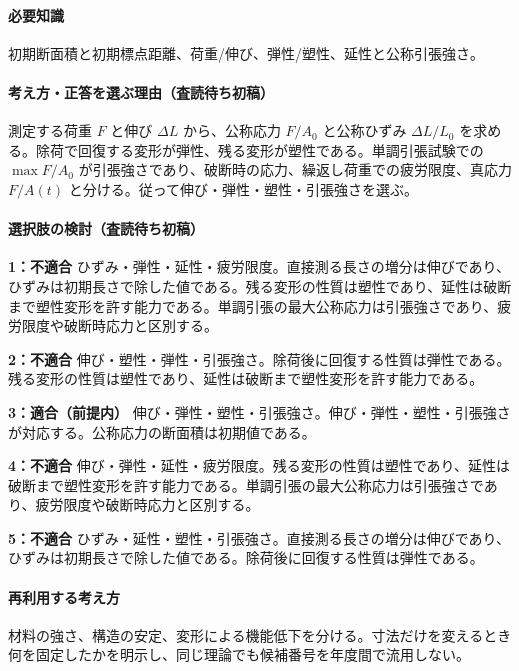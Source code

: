 \paragraph{必要知識} 初期断面積と初期標点距離、荷重/伸び、弾性/塑性、延性と公称引張強さ。

\paragraph{考え方・正答を選ぶ理由（査読待ち初稿）} 測定する荷重 \(F\) と伸び \(\Delta L\) から、公称応力 \(F/A_0\) と公称ひずみ \(\Delta L/L_0\) を求める。除荷で回復する変形が弾性、残る変形が塑性である。単調引張試験での \(\max F/A_0\) が引張強さであり、破断時の応力、繰返し荷重での疲労限度、真応力 \(F/A(t)\) と分ける。従って伸び・弾性・塑性・引張強さを選ぶ。

\paragraph{選択肢の検討（査読待ち初稿）}\mbox{}\par

\noindent\textbf{1：不適合} ひずみ・弾性・延性・疲労限度。直接測る長さの増分は伸びであり、ひずみは初期長さで除した値である。残る変形の性質は塑性であり、延性は破断まで塑性変形を許す能力である。単調引張の最大公称応力は引張強さであり、疲労限度や破断時応力と区別する。\par

\noindent\textbf{2：不適合} 伸び・塑性・弾性・引張強さ。除荷後に回復する性質は弾性である。残る変形の性質は塑性であり、延性は破断まで塑性変形を許す能力である。\par

\noindent\textbf{3：適合（前提内）} 伸び・弾性・塑性・引張強さ。伸び・弾性・塑性・引張強さが対応する。公称応力の断面積は初期値である。\par

\noindent\textbf{4：不適合} 伸び・弾性・延性・疲労限度。残る変形の性質は塑性であり、延性は破断まで塑性変形を許す能力である。単調引張の最大公称応力は引張強さであり、疲労限度や破断時応力と区別する。\par

\noindent\textbf{5：不適合} ひずみ・延性・塑性・引張強さ。直接測る長さの増分は伸びであり、ひずみは初期長さで除した値である。除荷後に回復する性質は弾性である。\par

\paragraph{再利用する考え方} 材料の強さ、構造の安定、変形による機能低下を分ける。寸法だけを変えるとき何を固定したかを明示し、同じ理論でも候補番号を年度間で流用しない。


